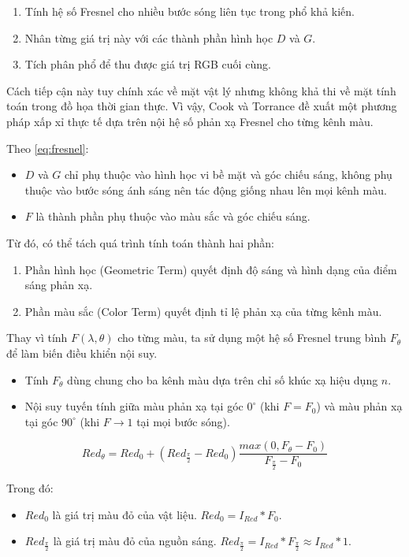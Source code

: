 \begin{enumerate}
	\item Tính hệ số Fresnel cho nhiều bước sóng liên tục trong phổ khả kiến.
	\item Nhân từng giá trị này với các thành phần hình học $D$ và $G$.
	\item Tích phân phổ để thu được giá trị RGB cuối cùng.
\end{enumerate}

Cách tiếp cận này tuy chính xác về mặt vật lý nhưng không khả thi về mặt tính toán trong đồ họa thời gian thực. Vì vậy, Cook và Torrance đề xuất một phương pháp xấp xỉ thực tế dựa trên nội hệ số phản xạ Fresnel cho từng kênh màu.

Theo \eqref{eq:fresnel}:
\begin{itemize}
	\item $D$ và $G$ chỉ phụ thuộc vào hình học vi bề mặt và góc chiếu sáng, không phụ thuộc vào bước sóng ánh sáng nên tác động giống nhau lên mọi kênh màu.
	\item $F$ là thành phần phụ thuộc vào màu sắc và góc chiếu sáng.
\end{itemize}

Từ đó, có thể tách quá trình tính toán thành hai phần:
\begin{enumerate}
	\item Phần hình học (Geometric Term) quyết định độ sáng và hình dạng của điểm sáng phản xạ.
	\item Phần màu sắc (Color Term) quyết định tỉ lệ phản xạ của từng kênh màu.
\end{enumerate}

Thay vì tính $F(\lambda, \theta)$ cho từng màu, ta sử dụng một hệ số Fresnel trung bình $F_\theta$ để làm biến điều khiển nội suy.

\begin{itemize}
	\item Tính $F_\theta$ dùng chung cho ba kênh màu dựa trên chỉ số khúc xạ hiệu dụng $n$.
	\item Nội suy tuyến tính giữa màu phản xạ tại góc $0^\circ$ (khi $F = F_0$) và màu phản xạ tại góc $90^\circ$ (khi $F \rightarrow 1$ tại mọi bước sóng).
\end{itemize}
\begin{equation}
	Red_{\theta} = Red_0 + (Red_{\frac{\pi}{2}} - Red_0) \frac{max(0, F_\theta - F_0)}{F_{\frac{\pi}{2}} - F_0}
\end{equation}

Trong đó:
\begin{itemize}
	\item $Red_0$ là giá trị màu đỏ của vật liệu. $Red_0 = I_{Red} * F_0$.
	\item $Red_{\frac{\pi}{2}}$ là giá trị màu đỏ của nguồn sáng. $Red_{\frac{\pi}{2}} = I_{Red} * F_{\frac{\pi}{2}} \approx I_{Red} * 1$.
\end{itemize}

